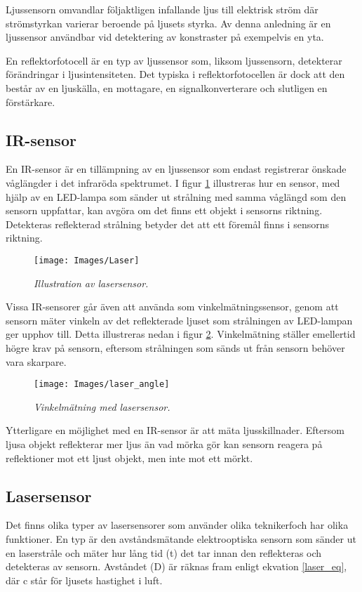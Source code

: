 \documentclass[11pt]{article}
\begin{document}
\begin{flushleft}
Ljussensorn omvandlar följaktligen infallande ljus till elektrisk ström där strömstyrkan varierar beroende på ljusets styrka. Av denna anledning är en ljussensor användbar vid detektering av konstraster på exempelvis en yta. \cite{612896}

En reflektorfotocell är en typ av ljussensor som, liksom ljussensorn, detekterar förändringar i ljusintensiteten. Det typiska i reflektorfotocellen är dock att den  består av en ljuskälla, en mottagare, en signalkonverterare och slutligen en förstärkare. \cite{website:automation} 


\subsection{IR-sensor}
En IR-sensor är en tillämpning av en ljussensor som endast registrerar önskade våglängder i det infraröda spektrumet. I figur \ref{Laser} illustreras hur en sensor, med hjälp av en LED-lampa som sänder ut strålning med samma våglängd som den sensorn uppfattar, kan avgöra om det finns ett objekt i sensorns riktning. Detekteras reflekterad strålning betyder det att ett föremål finns i sensorns riktning. \cite{website:cmu}

\begin{figure}[htbp]
	\centering
	\texttt{[image: Images/Laser]}
	\caption{\textit{Illustration av lasersensor.} \label{Laser}}
\end{figure}

Vissa IR-sensorer går även att använda som vinkelmätningssensor, genom att sensorn mäter vinkeln av det reflekterade ljuset som strålningen av LED-lampan ger upphov till. Detta illustreras nedan i figur \ref{laser_angle}. Vinkelmätning ställer emellertid högre krav på sensorn, eftersom strålningen som sänds ut från sensorn behöver vara skarpare.

\begin{figure}[htbp]
	\centering
	\texttt{[image: Images/laser\_angle]}
	\caption{\textit{Vinkelmätning med lasersensor.} \label{laser_angle}}
\end{figure}

Ytterligare en möjlighet med en IR-sensor är att mäta ljusskillnader. Eftersom ljusa objekt reflekterar mer ljus än vad mörka gör kan sensorn reagera på reflektioner mot ett ljust objekt, men inte mot ett mörkt. \cite{website:cmu}

\subsection{Lasersensor}
Det finns olika typer av lasersensorer som använder olika teknikerfoch har olika funktioner. En typ är den avståndsmätande elektrooptiska sensorn som sänder ut en laserstråle och mäter hur lång tid (t) det tar innan den reflekteras och detekteras av sensorn. Avståndet (D) är räknas fram enligt ekvation \ref{laser_eq}, där c står för ljusets hastighet i luft. \cite{website:mti}



\end{flushleft}
\end{document}
